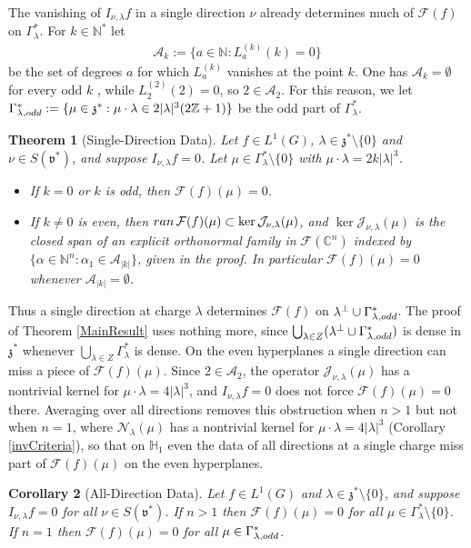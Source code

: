 \documentclass[11pt]{amsart}
\theoremstyle{plain}
\newtheorem{theorem}{Theorem}[section]
\newtheorem{corollary}[theorem]{Corollary}
\theoremstyle{definition}
\theoremstyle{remark}
\numberwithin{equation}{section}
\def\fz{\mathfrak{z}}
\def\fv{\mathfrak{v}}
\def\cA{\mathcal{A}}
\def\cN{\mathcal{N}}
\def\cJ{\mathcal{J}}
\def\cF{\mathcal{F}}
\def\mz{\setminus\{0\}}
\def\C{{\mathbb C}}%
\def\N{{\mathbb N}}%
\def\Z{{\mathbb Z}}%
\def \heis {\mathbb{H}}
\numberwithin{equation}{section}
\begin{document}
The vanishing of $I_{\nu, \lambda}f$ in a single direction $\nu$ already determines much of $\cF(f)$ on $\Gamma_\lambda^*$. For $k\in \N^*$ let
\begin{align*}
	\cA_k:=\{a\in \N: L_a^{(k)}(k)=0\}
\end{align*}
be the set of degrees $a$ for which $L_a^{(k)}$ vanishes at the point $k$. One has $\cA_k=\emptyset$ for every odd $k$ \cite{flynnInjectivityHeisenbergXray2021}, while $L_2^{(2)}(2)=0$, so $2\in \cA_2$. For this reason, we let $\Gamma_{\lambda, \rm odd}^*:=\{\mu\in \fz^*: \mu\cdot\lambda\in 2|\lambda|^3(2\Z+1)\}$ be the odd part of $\Gamma_\lambda^*$.
\begin{theorem}[Single-Direction Data]\label{t:singleDirection}
	Let $f\in L^1(G)$, $\lambda\in \fz^*\mz$ and $\nu\in S(\fv^*)$, and suppose $I_{\nu, \lambda}f=0$. Let $\mu\in \Gamma_\lambda^*\mz$ with $\mu\cdot\lambda=2k|\lambda|^3$.
	\begin{itemize}
		\item[(a)] If $k=0$ or $k$ is odd, then $\cF(f)(\mu)=0$.
		\item[(b)] If $k\neq0$ is even, then ${\rm ran}\,\cF(f)(\mu)\subset\ker\cJ_{\nu, \lambda}(\mu)$, and $\ker\cJ_{\nu, \lambda}(\mu)$ is the closed span of an explicit orthonormal family in $\cF(\C^n)$ indexed by $\{\alpha\in \N^n: \alpha_1\in \cA_{|k|}\}$, given in the proof. In particular $\cF(f)(\mu)=0$ whenever $\cA_{|k|}=\emptyset$.
	\end{itemize}
\end{theorem}
Thus a single direction at charge $\lambda$ determines $\cF(f)$ on $\lambda^\perp\cup\Gamma^*_{\lambda, \rm odd}$. The proof of Theorem \ref{MainResult} uses nothing more, since  $\bigcup_{\lambda\in Z}(\lambda^\perp\cup\Gamma^*_{\lambda, \rm odd})$ is dense in $\fz^*$ whenever $\bigcup_{\lambda\in Z}\Gamma^*_\lambda$ is dense. On the even hyperplanes a single direction can miss a piece of $\cF(f)(\mu)$. Since $2\in \cA_2$, the operator $\cJ_{\nu, \lambda}(\mu)$ has a nontrivial kernel for $\mu\cdot\lambda=4|\lambda|^3$, and $I_{\nu, \lambda}f=0$ does not force $\cF(f)(\mu)=0$ there. Averaging over all directions removes this obstruction when $n>1$ but not when $n=1$, where $\cN_\lambda(\mu)$ has a nontrivial kernel for $\mu\cdot\lambda=4|\lambda|^3$ (Corollary \ref{invCriteria}), so that on $\heis_1$ even the data of all directions at a single charge miss part of $\cF(f)(\mu)$ on the even hyperplanes.
\begin{corollary}[All-Direction Data]\label{chargeFrequency}
	Let $f\in L^1(G)$ and $\lambda\in \fz^*\mz$, and suppose $I_{\nu, \lambda}f=0$ for all $\nu\in S(\fv^*)$. If $n>1$ then $\cF(f)(\mu)=0$ for all $\mu\in \Gamma_\lambda^*\mz$. If $n=1$ then $\cF(f)(\mu)=0$ for all $\mu\in \Gamma_{\lambda, \rm odd}^*$.
\end{corollary}
\end{document}
